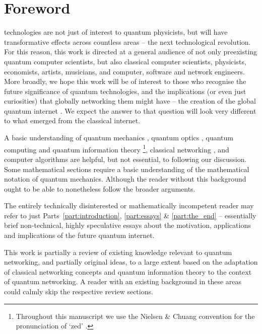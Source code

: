 %
%

\section{Foreword}\label{sec:foreword}

 technologies are not just of interest to quantum physicists, but will have transformative effects across countless areas -- the next technological revolution. For this reason, this work is directed at a general audience of not only preexisting quantum computer scientists, but also classical computer scientists, physicists, economists, artists, musicians, and computer, software and network engineers. More broadly, we hope this work will be of interest to those who recognise the future significance of quantum technologies, and the implications (or even just curiosities) that globally networking them might have -- the creation of the global quantum internet \cite{bib:van2014quantum, bib:kimble2008quantum}. We expect the answer to that question will look very different to what emerged from the classical internet.

A basic understanding of quantum mechanics \cite{bib:Sakurai94}, quantum optics \cite{bib:GerryKnight05}, quantum computing and quantum information theory \cite{bib:NielsenChuang00}\footnote{Throughout this manuscript we use the Nielsen \& Chuang convention for the pronunciation of `zed' \cite{bib:NielsenChuang00}.}, classical networking \cite{bib:TanenbaumNet}, and computer algorithms \cite{bib:RivestAlgBook} are helpful, but not essential, to following our discussion. Some mathematical sections require a basic understanding of the mathematical notation of quantum mechanics. Although the reader without this background ought to be able to nonetheless follow the broader arguments.

The entirely technically disinterested or mathematically incompetent reader may refer to just Parts~\ref{part:introduction}, \ref{part:essays} \& \ref{part:the_end} -- essentially brief non-technical, highly speculative essays about the motivation, applications and implications of the future quantum internet.

This work is partially a review of existing knowledge relevant to quantum networking, and partially original ideas, to a large extent based on the adaptation of classical networking concepts and quantum information theory to the context of quantum networking. A reader with an existing background in these areas could calmly skip the respective review sections.

